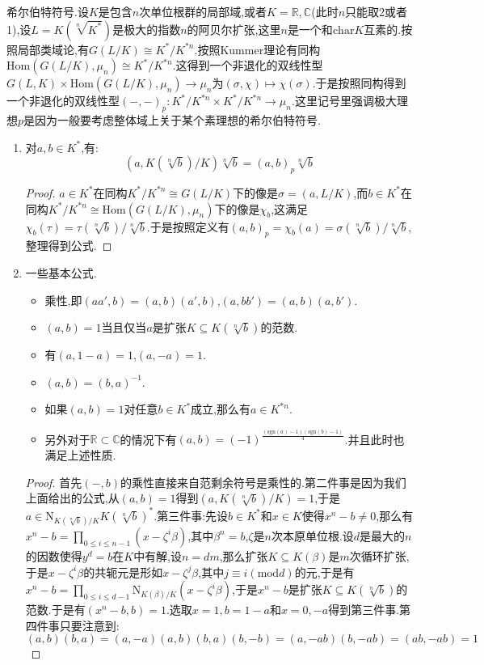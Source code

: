 希尔伯特符号.设$K$是包含$n$次单位根群的局部域,或者$K=\mathbb{R},\mathbb{C}$(此时$n$只能取2或者1),设$L=K(\sqrt[n]{K^*})$是极大的指数$n$的阿贝尔扩张,这里$n$是一个和$\mathrm{char}K$互素的.按照局部类域论,有$G(L/K)\cong K^*/K^{*n}$.按照Kummer理论有同构$\mathrm{Hom}(G(L/K),\mu_n)\cong K^*/K^{*n}$.这得到一个非退化的双线性型$G(L,K)\times\mathrm{Hom}(G(L/K),\mu_n)\to\mu_n$为$(\sigma,\chi)\mapsto\chi(\sigma)$.于是按照同构得到一个非退化的双线性型$(-,-)_p:K^*/K^{*n}\times K^*/K^{*n}\to\mu_n$.这里记号里强调极大理想$p$是因为一般要考虑整体域上关于某个素理想的希尔伯特符号.
\begin{enumerate}
	\item 对$a,b\in K^*$,有:$$(a,K(\sqrt[n]{b})/K)\sqrt[n]{b}=(a,b)_p\sqrt[n]{b}$$
	\begin{proof}
		
		$a\in K^*$在同构$K^*/K^{*n}\cong G(L/K)$下的像是$\sigma=(a,L/K)$,而$b\in K^*$在同构$K^*/K^{*n}\cong\mathrm{Hom}(G(L/K),\mu_n)$下的像是$\chi_b$,这满足$\chi_b(\tau)=\tau(\sqrt[n]{b})/\sqrt[n]{b}$.于是按照定义有$(a,b)_p=\chi_b(a)=\sigma(\sqrt[n]{b})/\sqrt[n]{b}$,整理得到公式.
	\end{proof}
    \item 一些基本公式.
    \begin{itemize}
    	\item 乘性,即$(aa',b)=(a,b)(a',b)$,$(a,bb')=(a,b)(a,b')$.
    	\item $(a,b)=1$当且仅当$a$是扩张$K\subseteq K(\sqrt[n]{b})$的范数.
    	\item 有$(a,1-a)=1$,$(a,-a)=1$.
    	\item $(a,b)=(b,a)^{-1}$.
    	\item 如果$(a,b)=1$对任意$b\in K^*$成立,那么有$a\in K^{*n}$.
    	\item 另外对于$\mathbb{R}\subset\mathbb{C}$的情况下有$(a,b)=(-1)^{\frac{(\mathrm{sgn}(a)-1)(\mathrm{sgn}(b)-1)}{4}}$.并且此时也满足上述性质.
    \end{itemize}
    \begin{proof}
    	
    	首先$(-,b)$的乘性直接来自范剩余符号是乘性的.第二件事是因为我们上面给出的公式,从$(a,b)=1$得到$(a,K(\sqrt[n]{b})/K)=1$,于是$a\in\mathrm{N}_{K(\sqrt[n]{b})/K}K(\sqrt[n]{b})^*$.第三件事:先设$b\in K^*$和$x\in K$使得$x^n-b\not=0$,那么有$x^n-b=\prod_{0\le i\le n-1}(x-\zeta^i\beta)$,其中$\beta^n=b$,$\zeta$是$n$次本原单位根.设$d$是最大的$n$的因数使得$y^d=b$在$K$中有解,设$n=dm$,那么扩张$K\subseteq K(\beta)$是$m$次循环扩张,于是$x-\zeta^i\beta$的共轭元是形如$x-\zeta^j\beta$,其中$j\equiv i(\mathrm{mod}d)$的元,于是有$x^n-b=\prod_{0\le i\le d-1}\mathrm{N}_{K(\beta)/K}(x-\zeta^i\beta)$,于是$x^n-b$是扩张$K\subseteq K(\sqrt[n]{b})$的范数.于是有$(x^n-b,b)=1$.选取$x=1,b=1-a$和$x=0,-a$得到第三件事.第四件事只要注意到:
    	$$(a,b)(b,a)=(a,-a)(a,b)(b,a)(b,-b)=(a,-ab)(b,-ab)=(ab,-ab)=1$$
    \end{proof}
\end{enumerate}


